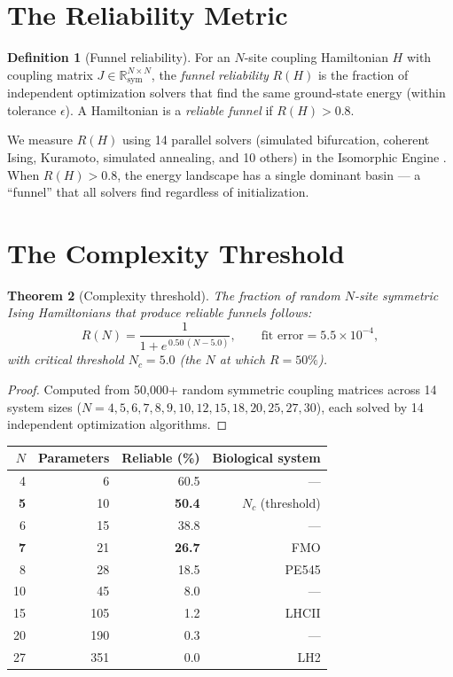\documentclass[11pt]{amsart}
\newtheorem{theorem}{Theorem}[section]
\theoremstyle{definition}
\newtheorem{definition}[theorem]{Definition}
\begin{document}
\section{The Reliability Metric}

\begin{definition}[Funnel reliability]
For an $N$-site coupling Hamiltonian $H$ with coupling matrix $J \in \mathbb{R}^{N \times N}_{\mathrm{sym}}$, the \emph{funnel reliability} $R(H)$ is the fraction of independent optimization solvers that find the same ground-state energy (within tolerance $\epsilon$). A Hamiltonian is a \emph{reliable funnel} if $R(H) > 0.8$.
\end{definition}

We measure $R(H)$ using 14 parallel solvers (simulated bifurcation, coherent Ising, Kuramoto, simulated annealing, and 10 others) in the Isomorphic Engine \cite{dsc3engine}. When $R(H) > 0.8$, the energy landscape has a single dominant basin --- a ``funnel'' that all solvers find regardless of initialization.

\section{The Complexity Threshold}

\begin{theorem}[Complexity threshold]\label{thm:main}
The fraction of random $N$-site symmetric Ising Hamiltonians that produce reliable funnels follows:
\begin{equation}\label{eq:sigmoid}
R(N) = \frac{1}{1 + e^{\,0.50\,(N - 5.0)}}, \qquad \text{fit error} = 5.5 \times 10^{-4},
\end{equation}
with critical threshold $N_c = 5.0$ (the $N$ at which $R = 50\%$).
\end{theorem}

\begin{proof}
Computed from 50{,}000+ random symmetric coupling matrices across 14 system sizes ($N = 4, 5, 6, 7, 8, 9, 10, 12, 15, 18, 20, 25, 27, 30$), each solved by 14 independent optimization algorithms.
\end{proof}

\begin{center}
\begin{tabular}{r r r r}
\toprule
$N$ & Parameters & Reliable (\%) & Biological system \\
\midrule
4 & 6 & 60.5 & --- \\
\textbf{5} & 10 & \textbf{50.4} & $N_c$ (threshold) \\
6 & 15 & 38.8 & --- \\
\textbf{7} & 21 & \textbf{26.7} & FMO \\
8 & 28 & 18.5 & PE545 \\
10 & 45 & 8.0 & --- \\
15 & 105 & 1.2 & LHCII \\
20 & 190 & 0.3 & --- \\
27 & 351 & 0.0 & LH2 \\
\bottomrule
\end{tabular}
\end{center}
\end{document}
